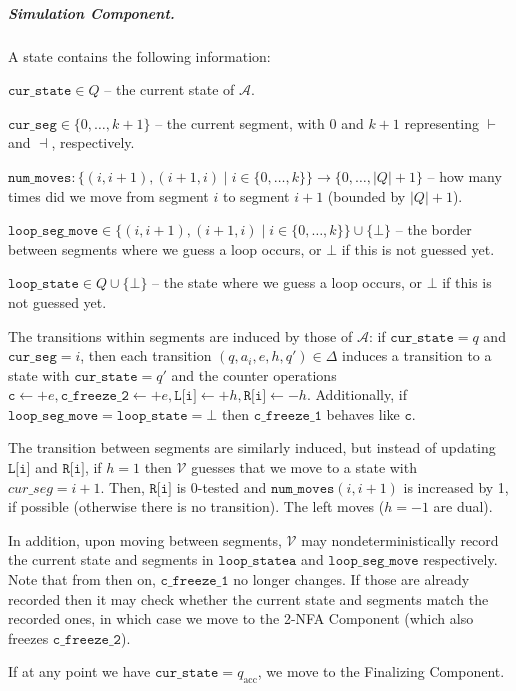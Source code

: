 \documentclass[11pt,a4paper]{amsart}
\theoremstyle{definition}
\newcommand{\lmark}{\vdash}
\newcommand{\rmark}{\dashv}
\newcommand{\accstate}{q_{\mathrm{acc}}}
\newcommand{\adds}[1]{\leftarrow #1}
\newcommand{\vf}[1]{\texttt{#1}}
\newcommand{\cA}{\mathcal{A}}
\newcommand{\cV}{\mathcal{V}}
\begin{document}
\subparagraph*{Simulation Component.} A state contains the following
information:
\begin{compactitem}
\item $\vf{cur\_state}\in Q$ -- the current state of $\cA$.
\item $\vf{cur\_seg}\in \{0,\ldots,k+1\}$ -- the current segment, with $0$ and $k+1$
representing $\lmark$ and $\rmark$, respectively.
\item $\vf{num\_moves}\colon\{(i,i+1),(i+1,i)\mid i\in \{0,\ldots,k\}\}\to \{0,\ldots,|Q|+1\}$ --
how many times did we move from segment $i$ to segment $i+1$ (bounded by
$|Q|+1$).
\item $\vf{loop\_seg\_move}\in \{(i,i+1),(i+1,i)\mid i\in \{0,\ldots,k\}\}\cup\{\bot\}$ -- the
border between segments where we guess a loop occurs, or $\bot$ if this is not
guessed yet.
\item $\vf{loop\_state}\in Q\cup\{\bot\}$ -- the state where we guess a loop occurs,
or $\bot$ if this is not guessed yet.
\end{compactitem} 
The transitions within segments are induced by those of $\cA$: if
$\vf{cur\_state}=q$ and $\vf{cur\_seg}=i$, then each transition
$(q,a_i,e,h,q')\in \Delta$ induces a transition to a state with $\vf{cur\_state}=q'$
and the counter operations
$\vf{c}\adds{+e}, \vf{c\_freeze\_2}\adds{+e}, \vf{L[i]}\adds{+h}, \vf{R[i]}\adds{-h}$.
Additionally, if $\vf{loop\_seg\_move}=\vf{loop\_state}=\bot$ then
$\vf{c\_freeze\_1}$ behaves like $\vf{c}$.

The transition between segments are similarly induced, but instead of updating
$\vf{L[i]}$ and $\vf{R[i]}$, if $h=1$ then $\cV$ guesses that we move to a state
with $cur\_seg=i+1$. Then, $\vf{R[i]}$ is 0-tested and $\vf{num\_moves}(i,i+1)$
is increased by 1, if possible (otherwise there is no transition).  The left
moves ($h=-1$ are dual).

In addition, upon moving between segments, $\cV$ may nondeterministically record
the current state and segments in $\vf{loop\_statea}$ and $\vf{loop\_seg\_move}$
respectively. Note that from then on, $\vf{c\_freeze\_1}$ no longer changes. If
those are already recorded then it may check whether the current state and
segments match the recorded ones, in which case we move to the 2-NFA Component
(which also freezes $\vf{c\_freeze\_2}$).

If at any point we have $\vf{cur\_state}=\accstate$, we move to the Finalizing
Component.
\end{document}
